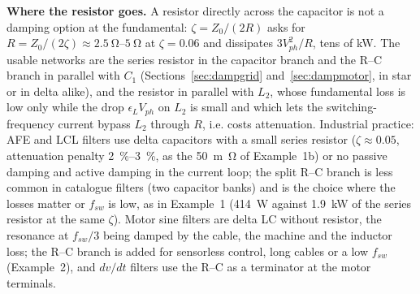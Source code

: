 \documentclass[10pt,a4paper]{scrartcl}
\newcommand{\fsw}{f_{sw}}
\begin{document}
\begin{onehalfspace}
\textbf{Where the resistor goes.} A resistor directly across the capacitor is not a damping option at the fundamental: $\zeta = Z_0/(2R)$ asks for $R = Z_0/(2\zeta) \approx \SIrange{2.5}{5}{\ohm}$ at $\zeta = 0.06$ and dissipates $3V_{ph}^2/R$, tens of kW. The usable networks are the series resistor in the capacitor branch and the R--C branch in parallel with $C_1$ (Sections~\ref{sec:dampgrid} and~\ref{sec:dampmotor}, in star or in delta alike), and the resistor in parallel with $L_2$, whose fundamental loss is low only while the drop $\epsilon_L V_{ph}$ on $L_2$ is small and which lets the switching-frequency current bypass $L_2$ through $R$, i.e. costs attenuation. Industrial practice: AFE and LCL filters use delta capacitors with a small series resistor ($\zeta \approx 0.05$, attenuation penalty \SIrange{2}{3}{\percent}, as the \SI{50}{m\ohm} of Example~1b) or no passive damping and active damping in the current loop; the split R--C branch is less common in catalogue filters (two capacitor banks) and is the choice where the losses matter or $\fsw$ is low, as in Example~1 (\SI{414}{W} against \SI{1.9}{kW} of the series resistor at the same $\zeta$). Motor sine filters are delta LC without resistor, the resonance at $\fsw/3$ being damped by the cable, the machine and the inductor loss; the R--C branch is added for sensorless control, long cables or a low $\fsw$ (Example~2), and $dv/dt$ filters use the R--C as a terminator at the motor terminals.


\end{onehalfspace}
\end{document}
